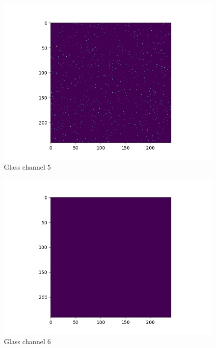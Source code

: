 \documentclass[12pt,reqno]{amsart}
\numberwithin{equation}{section}
\begin{document}
\begin{enumerate}
\begin{figure}[H]
\centering
\includegraphics[scale=0.6]{glass_channel_5}
\caption{Glass channel 5}
\end{figure}

\begin{figure}[H]
\centering
\includegraphics[scale=0.6]{glass_channel_6}
\caption{Glass channel 6}
\end{figure}


\end{enumerate}
\end{document}
